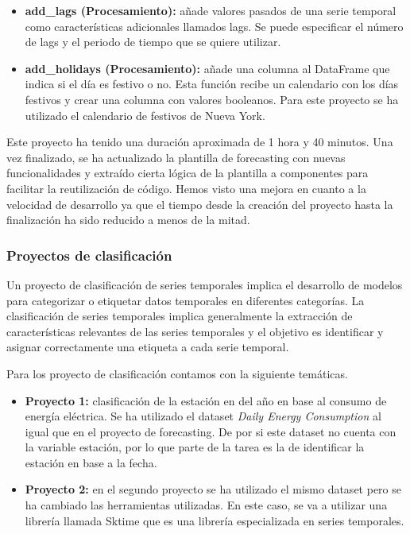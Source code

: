 \begin{itemize}
    \item \textbf{add\_lags (Procesamiento):} añade valores pasados de una serie temporal
    como características adicionales llamados lags. Se puede especificar el número de lags
    y el periodo de tiempo que se quiere utilizar.
    \item \textbf{add\_holidays (Procesamiento):} añade una columna al DataFrame que indica
    si el día es festivo o no. Esta función recibe un calendario con los días festivos
    y crear una columna con valores booleanos. Para este proyecto se ha utilizado el calendario
    de festivos de Nueva York.
\end{itemize}

Este proyecto ha tenido una duración aproximada de 1 hora y 40 minutos. Una vez finalizado,
se ha actualizado la plantilla de forecasting con nuevas funcionalidades y extraído cierta
lógica de la plantilla a componentes para facilitar la reutilización de código. Hemos visto
una mejora en cuanto a la velocidad de desarrollo ya que el tiempo desde la creación del proyecto
hasta la finalización ha sido reducido a menos de la mitad.

\subsubsection{Proyectos de clasificación}
Un proyecto de clasificación de series temporales implica el desarrollo de modelos para 
categorizar o etiquetar datos temporales en diferentes categorías. La clasificación de 
series temporales implica generalmente la extracción de características relevantes 
de las series temporales y el objetivo es identificar y asignar correctamente una 
etiqueta a cada serie temporal.\medskip

Para los proyecto de clasificación contamos con la siguiente temáticas.

\begin{itemize}
    \item \textbf{Proyecto 1:} clasificación de la estación en del año en base al consumo de energía eléctrica.
    Se ha utilizado el dataset \textit{Daily Energy Consumption} \cite{Hourly_Energy} al igual
    que en el proyecto de forecasting. De por si este dataset no cuenta con la variable estación,
    por lo que parte de la tarea es la de identificar la estación en base a la fecha.
    \item \textbf{Proyecto 2:} en el segundo proyecto se ha utilizado el mismo dataset pero se ha
    cambiado las herramientas utilizadas. En este caso, se va a utilizar una librería 
    llamada Sktime que es una librería especializada en series temporales.
\end{itemize}

